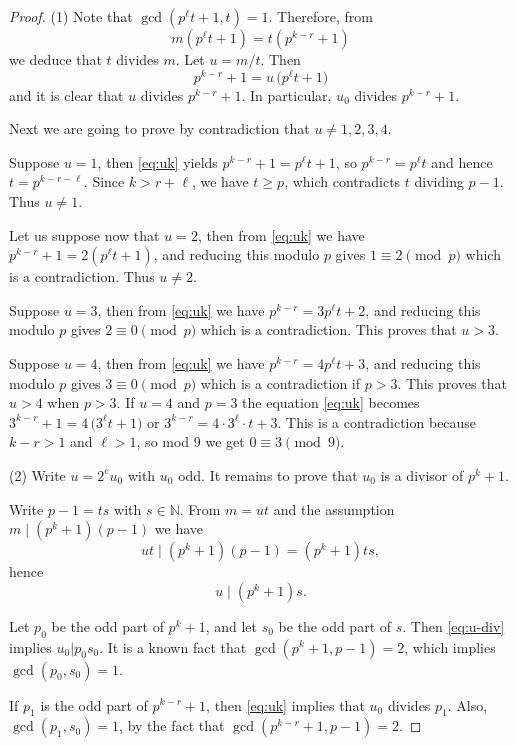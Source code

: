 \documentclass[10pt,a4paper]{amsart}
\begin{document}
\begin{proof}
(1) \quad Note that
$  \gcd(p^\ell t+1,t) = 1$.
Therefore, from
\[
  m(p^\ell t+1) = t(p^{k-r}+1)
\]
we deduce that $t$ divides $m$. Let $u=m/t$.
Then
\begin{equation}\label{eq:uk}
  p^{k-r}+1 = u\,\bigl(p^\ell t+1\bigr)
\end{equation}
and it is clear that $u$ divides $p^{k-r}+1$.
In particular, $u_0$ divides $p^{k-r}+1$.

Next we are going to prove by contradiction that $u\neq 1,2,3,4$.

Suppose $u=1$, then \eqref{eq:uk} yields
$  p^{k-r}+1 = p^\ell t+1$,
so $p^{k-r} = p^\ell t$ and hence $t = p^{k-r-\ell}$. Since $k>r+\ell$,
we have $t\ge p$, which contradicts $t$ dividing $p-1$.
Thus $u\neq1$.

Let us suppose now that $u=2$, then from \eqref{eq:uk} we have
$p^{k-r}+1 = 2(p^\ell t+1)$,
and reducing this modulo $p$ gives $1\equiv 2 \pmod{p}$ which is a contradiction.
 Thus $u\neq2$. 

Suppose $u=3$, then from \eqref{eq:uk} we have
$ p^{k-r} = 3p^\ell t+2$,
and reducing this modulo $p$ gives $2\equiv 0 \pmod{p}$ which is a contradiction.
This proves that $u>3$.


Suppose $u=4$, then from \eqref{eq:uk} we have
$ p^{k-r} = 4p^\ell t+3$,
and reducing this modulo $p$ gives $3\equiv 0 \pmod{p}$ which is a contradiction if $p>3$.
This proves that $u>4$ when $p>3$.
If $u=4$ and $p=3$ the equation \eqref{eq:uk} becomes
$3^{k-r}+1 = 4\,\bigl(3^\ell t+1\bigr)$
or
$3^{k-r} = 4\cdot 3^\ell \cdot t+3$.
This is a contradiction because $k-r>1$ and $\ell >1$,
so mod 9 we get $0\equiv 3 \pmod{9}$.

(2) \quad  Write $u = 2^e u_0$ with $u_0$ odd.
It remains to prove that $u_0$ is a divisor of  $p^k+1$.

Write $p-1 = ts$ with $s\in\mathbb{N}$. From $m=ut$ and the
assumption $m\mid (p^k+1)(p-1)$ we have
\[
  ut  \mid (p^k+1)(p-1) = (p^k+1)ts,
\]
hence
\begin{equation}\label{eq:u-div}
  u \mid (p^k+1)s.
\end{equation}

Let $p_0$ be the odd part of $p^k+1$, and let $s_0$ be the odd part of $s$.
Then \eqref{eq:u-div} implies $u_0 | p_0 s_0$.
It is a known fact that $\gcd(p^k+1,p-1)=2$, which implies $\gcd(p_0,s_0)=1$.


If $p_1$ is the odd part of $p^{k-r}+1$, then 
\eqref{eq:uk} implies that $u_0$ divides $p_1$.
Also, $\gcd(p_1,s_0)=1$, by the fact that $\gcd(p^{k-r}+1,p-1)=2$.


\end{proof}
\end{document}
